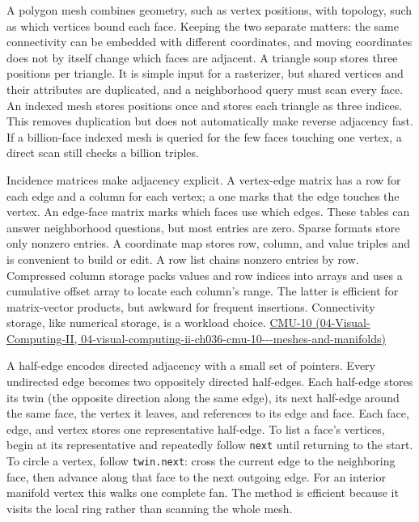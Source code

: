 A polygon mesh combines geometry, such as vertex positions, with topology, such as which vertices bound each face. Keeping the two separate matters: the same connectivity can be embedded with different coordinates, and moving coordinates does not by itself change which faces are adjacent. A triangle soup stores three positions per triangle. It is simple input for a rasterizer, but shared vertices and their attributes are duplicated, and a neighborhood query must scan every face. An indexed mesh stores positions once and stores each triangle as three indices. This removes duplication but does not automatically make reverse adjacency fast. If a billion-face indexed mesh is queried for the few faces touching one vertex, a direct scan still checks a billion triples.

Incidence matrices make adjacency explicit. A vertex-edge matrix has a row for each edge and a column for each vertex; a one marks that the edge touches the vertex. An edge-face matrix marks which faces use which edges. These tables can answer neighborhood questions, but most entries are zero. Sparse formats store only nonzero entries. A coordinate map stores row, column, and value triples and is convenient to build or edit. A row list chains nonzero entries by row. Compressed column storage packs values and row indices into arrays and uses a cumulative offset array to locate each column's range. The latter is efficient for matrix-vector products, but awkward for frequent insertions. Connectivity storage, like numerical storage, is a workload choice. \href{../04-Visual-Computing-II/main.pdf\#nameddest=04-visual-computing-ii-ch036-cmu-10---meshes-and-manifolds}{CMU-10 (04-Visual-Computing-II, 04-visual-computing-ii-ch036-cmu-10-\/-\/-meshes-and-manifolds)}

A half-edge encodes directed adjacency with a small set of pointers. Every undirected edge becomes two oppositely directed half-edges. Each half-edge stores its twin (the opposite direction along the same edge), its next half-edge around the same face, the vertex it leaves, and references to its edge and face. Each face, edge, and vertex stores one representative half-edge. To list a face's vertices, begin at its representative and repeatedly follow \texttt{next} until returning to the start. To circle a vertex, follow \texttt{twin.next}: cross the current edge to the neighboring face, then advance along that face to the next outgoing edge. For an interior manifold vertex this walks one complete fan. The method is efficient because it visits the local ring rather than scanning the whole mesh.

